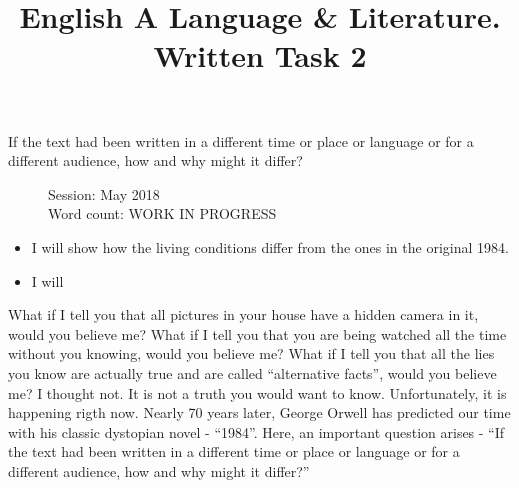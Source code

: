 \documentclass[a4paper,12pt]{article}
\title{English A Language \& Literature. Written Task 2}
\date{}
\author{}
\begin{document}
\maketitle
\begin{center}
If the text had been written in a different time or place or language or for a different audience, how and why might it differ?
\end{center}
\begin{flushleft}
\begin{figure}
Session: May 2018\\
Word count: WORK IN PROGRESS\\
\end{figure}
\end{flushleft}
\newpage

\begin{itemize}

\item I will show how the living conditions differ from the ones in the original 1984.

  \item I will   
  
  \end{itemize}



What if I tell you that all pictures in your house have a hidden camera in it, would you believe me? What if I tell you that you are being watched all the time without you knowing, would you believe me?  What if I tell you that all the lies you know are actually true and are called ``alternative facts'', would you believe me? I thought not. It is not a truth you would want to know. Unfortunately, it is happening rigth now. Nearly 70 years later, George Orwell has predicted our time with his classic dystopian novel - ``1984''. Here, an important question arises - ``If the text had been written in a different time or place or language or for a different audience, how and why might it differ?'' \\
\end{document}
